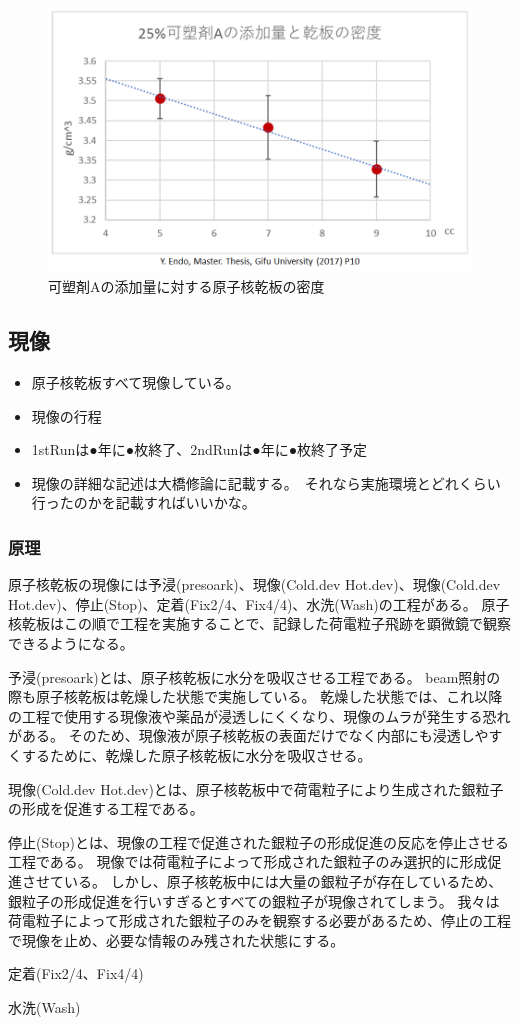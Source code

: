 \documentclass[12pt,a4paper]{jarticle}
\begin{document}
\begin{figure}[htbp]
  \centering
     \includegraphics[width=140mm]{kasozai.png}
  \caption{可塑剤Aの添加量に対する原子核乾板の密度\label{fig:kasozai}}
\end{figure}
\newpage
\subsection{現像}
\begin{itemize}
 \item 原子核乾板すべて現像している。
 \item 現像の行程
 \item 1stRunは●年に●枚終了、2ndRunは●年に●枚終了予定
 \item 現像の詳細な記述は大橋修論に記載する。　それなら実施環境とどれくらい行ったのかを記載すればいいかな。
\end{itemize}
\subsubsection{原理}
原子核乾板の現像には予浸(presoark)、現像(Cold.dev Hot.dev)、現像(Cold.dev Hot.dev)、停止(Stop)、定着(Fix2/4、Fix4/4)、水洗(Wash)の工程がある。
原子核乾板はこの順で工程を実施することで、記録した荷電粒子飛跡を顕微鏡で観察できるようになる。
\par
予浸(presoark)とは、原子核乾板に水分を吸収させる工程である。
beam照射の際も原子核乾板は乾燥した状態で実施している。
乾燥した状態では、これ以降の工程で使用する現像液や薬品が浸透しにくくなり、現像のムラが発生する恐れがある。
そのため、現像液が原子核乾板の表面だけでなく内部にも浸透しやすくするために、乾燥した原子核乾板に水分を吸収させる。
\par
現像(Cold.dev Hot.dev)とは、原子核乾板中で荷電粒子により生成された銀粒子の形成を促進する工程である。
\par
停止(Stop)とは、現像の工程で促進された銀粒子の形成促進の反応を停止させる工程である。
現像では荷電粒子によって形成された銀粒子のみ選択的に形成促進させている。
しかし、原子核乾板中には大量の銀粒子が存在しているため、銀粒子の形成促進を行いすぎるとすべての銀粒子が現像されてしまう。
我々は荷電粒子によって形成された銀粒子のみを観察する必要があるため、停止の工程で現像を止め、必要な情報のみ残された状態にする。
\par
定着(Fix2/4、Fix4/4)
\par
水洗(Wash)
\end{document}

